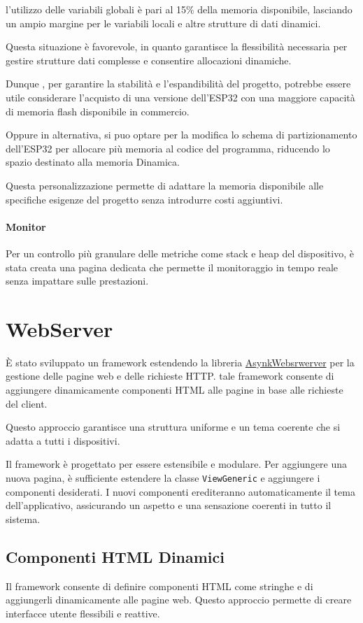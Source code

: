 \documentclass[12pt,a4paper]{report}
\begin{document}
l'utilizzo delle variabili globali è pari al 15\% della memoria disponibile, lasciando un ampio margine per le variabili locali e altre strutture di dati dinamici.

Questa situazione è favorevole, in quanto garantisce la flessibilità necessaria per gestire strutture dati complesse e consentire allocazioni dinamiche.

 

Dunque , per garantire la stabilità e l'espandibilità del progetto, potrebbe essere utile considerare l'acquisto di una versione dell'ESP32 con una maggiore capacità di memoria flash disponibile in commercio. 

Oppure in alternativa, si puo optare per la modifica  lo schema di partizionamento dell'ESP32 per allocare più memoria al codice del programma, riducendo lo spazio destinato alla memoria Dinamica. 

Questa personalizzazione permette di adattare la memoria disponibile alle specifiche esigenze del progetto senza introdurre costi aggiuntivi.


\paragraph{Monitor}
Per un controllo più granulare delle metriche come stack e heap del dispositivo, è stata creata una pagina dedicata che permette il monitoraggio in tempo reale senza impattare sulle prestazioni.

\section{WebServer}
È stato sviluppato un framework estendendo la libreria \href{URL}{AsynkWebsrwerver} per la gestione delle pagine web e delle richieste HTTP.
 tale framework consente di aggiungere dinamicamente componenti HTML alle pagine in base alle richieste del client. 
 
 Questo approccio garantisce una struttura uniforme e un tema coerente che si adatta a tutti i dispositivi.

Il framework è progettato per essere estensibile e modulare. Per aggiungere una nuova pagina, è sufficiente estendere la classe \texttt{ViewGeneric} e aggiungere i componenti desiderati. I nuovi componenti erediteranno automaticamente il tema dell'applicativo, assicurando un aspetto e una sensazione coerenti in tutto il sistema.

\newpage

\subsection{Componenti HTML Dinamici}
Il framework consente di definire componenti HTML come stringhe e di aggiungerli dinamicamente alle pagine web. Questo approccio permette di creare interfacce utente flessibili e reattive.
\end{document}
